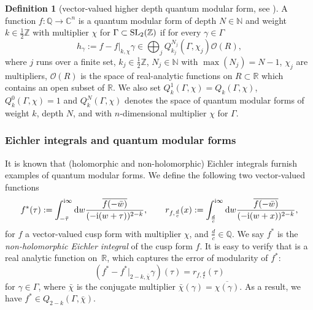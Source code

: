 \documentclass[pdftex]{sigma}
\def\BR{\mathbb{R}}
\def\BN{\mathbb{N}}
\def\BC{\mathbb{C}}
\def\BZ{\mathbb{Z}}
\theoremstyle{definition}
\newtheorem{defn}[thm]{Definition}
\numberwithin{equation}{section}
\begin{document}
\begin{defn}[vector-valued higher depth quantum modular form, see \cite{bringmann2019vectorvalued}]\label{dfn:higher_depth_qmf}
A function $f\colon{\mathbb Q}\to\BC^n$ is a quantum modular form of depth $N\in\BN$ and weight $k\in\frac{1}{2}\BZ$ with multiplier $\chi$ for $\Gamma\subset {\rm SL}_2(\BZ)$ if for every $\gamma\in\Gamma$
\[
	h_\gamma := f - f\lvert_{k,\chi}\gamma \in \bigoplus_j Q_{k_j}^{N_j} (\Gamma,\chi_j) \mathcal{O}(R),
\]
where $j$ runs over a finite set, $k_j\in\frac{1}{2}\BZ$, $N_j\in\BN$ with $\max (N_j)=N-1$, $\chi_j$ are multipliers, $\mathcal{O}(R)$ is the space of real-analytic functions on $R\subset\BR$ which contains an open subset of $\BR$. We also set $Q_k^1 (\Gamma,\chi)= Q_k (\Gamma,\chi)$, $Q_k^0 (\Gamma,\chi)=1$ and $Q_k^N (\Gamma,\chi)$ denotes the space of quantum modular forms of weight $k$, depth $N$, and with $n$-dimensional multiplier $\chi$ for $\Gamma$.
\end{defn}


\subsubsection*{Eichler integrals and quantum modular forms}
It is known that (holomorphic and non-holomorphic) Eichler integrals furnish examples of quantum modular forms. We define the following two vector-valued functions
\begin{equation}\label{dfn:Eich_period}
 f^\ast(\tau) := \int_{-\bar{\tau}}^{{\rm i}\infty} {\rm d}w
\frac{\overline{f(-\bar w)}}{(-{\rm i}(w+\tau))^{2-k}}, \qquad
r_{f,\frac{d}{c}} (x) := \int_{\frac{d}{c}}^{{\rm i}\infty} {\rm d}w
\frac{\overline{f(-\bar w)}}{(-{\rm i}(w+x))^{2-k}},
\end{equation}
for $f$ a vector-valued cusp form with multiplier $\chi$, and $\frac{d}{c}\in {\mathbb Q}$. We say $f^\ast$ is the {\it non-holomorphic Eichler integral} of the cusp form $f$. It is easy to verify that  is a real analytic function on~${\mathbb R}$, which captures the error of modularity of $f^\ast$:
\[
 ( f^\ast- f^\ast\lvert_{2-k,\bar\chi}\gamma)(\tau) = r_{f,\frac{d}{c}} (\tau)
\]
for $\gamma \in \Gamma$, where $\bar\chi$ is the conjugate multiplier $\bar\chi(\gamma)=\overline{\chi(\gamma)}$. As a result, we have $f^\ast\in Q_{2-k}(\Gamma, \bar \chi)$.
\end{document}
